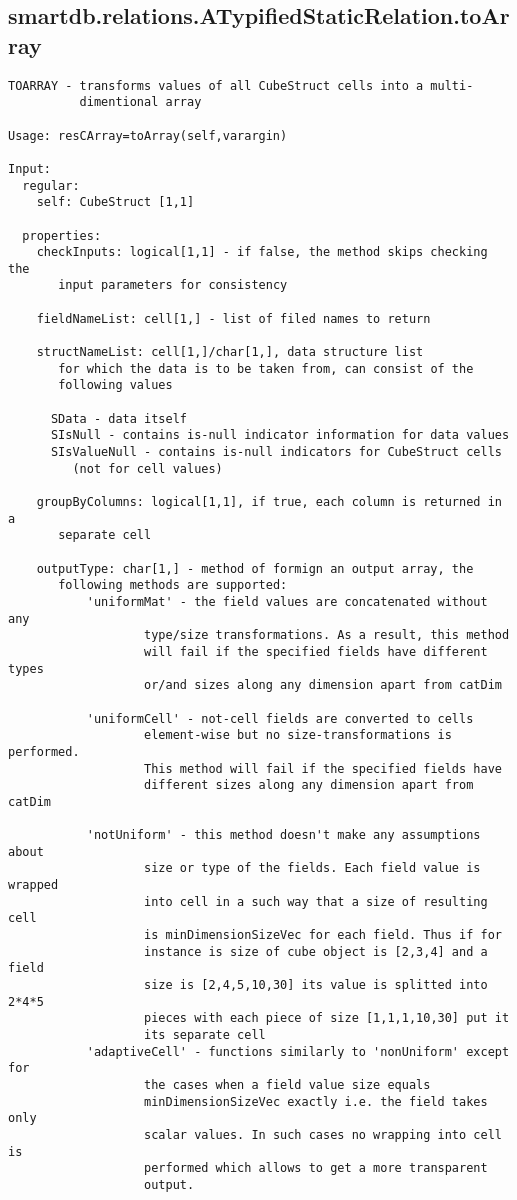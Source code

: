 \subsection{\texorpdfstring{smartdb.relations.ATypifiedStaticRelation.toArray}{toArray}}\label{method:smartdb.relations.ATypifiedStaticRelation.toArray}
\begin{verbatim}
TOARRAY - transforms values of all CubeStruct cells into a multi-
          dimentional array

Usage: resCArray=toArray(self,varargin)

Input:
  regular:
    self: CubeStruct [1,1]

  properties:
    checkInputs: logical[1,1] - if false, the method skips checking the
       input parameters for consistency

    fieldNameList: cell[1,] - list of filed names to return

    structNameList: cell[1,]/char[1,], data structure list
       for which the data is to be taken from, can consist of the
       following values

      SData - data itself
      SIsNull - contains is-null indicator information for data values
      SIsValueNull - contains is-null indicators for CubeStruct cells
         (not for cell values)

    groupByColumns: logical[1,1], if true, each column is returned in a
       separate cell

    outputType: char[1,] - method of formign an output array, the
       following methods are supported:
           'uniformMat' - the field values are concatenated without any
                   type/size transformations. As a result, this method
                   will fail if the specified fields have different types
                   or/and sizes along any dimension apart from catDim

           'uniformCell' - not-cell fields are converted to cells
                   element-wise but no size-transformations is performed.
                   This method will fail if the specified fields have
                   different sizes along any dimension apart from catDim

           'notUniform' - this method doesn't make any assumptions about
                   size or type of the fields. Each field value is wrapped
                   into cell in a such way that a size of resulting cell
                   is minDimensionSizeVec for each field. Thus if for
                   instance is size of cube object is [2,3,4] and a field
                   size is [2,4,5,10,30] its value is splitted into 2*4*5
                   pieces with each piece of size [1,1,1,10,30] put it
                   its separate cell
           'adaptiveCell' - functions similarly to 'nonUniform' except for
                   the cases when a field value size equals
                   minDimensionSizeVec exactly i.e. the field takes only
                   scalar values. In such cases no wrapping into cell is
                   performed which allows to get a more transparent
                   output.


\end{verbatim}
